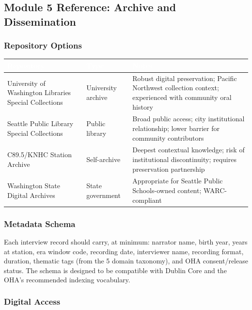 \documentclass[11pt,letterpaper]{article}
\newcommand{\tableheader}[1]{\textbf{\sffamily\textcolor{white}{#1}}}
\begin{document}
\subsection{Module 5 Reference: Archive and Dissemination}

\subsubsection{Repository Options}

\begin{center}
\begin{tabularx}{\textwidth}{L{4cm}L{2.5cm}X}
\toprule
{}
\tableheader{Repository} & \tableheader{Type} & \tableheader{Notes} \\
\midrule
University of Washington Libraries Special Collections & University archive & Robust digital preservation; Pacific Northwest collection context; experienced with community oral history \\
Seattle Public Library Special Collections & Public library & Broad public access; city institutional relationship; lower barrier for community contributors \\
C89.5/KNHC Station Archive & Self-archive & Deepest contextual knowledge; risk of institutional discontinuity; requires preservation partnership \\
Washington State Digital Archives & State government & Appropriate for Seattle Public Schools-owned content; WARC-compliant \\
\bottomrule
\end{tabularx}
\end{center}

\subsubsection{Metadata Schema}

Each interview record should carry, at minimum: narrator name, birth year, years at station, era window code, recording date, interviewer name, recording format, duration, thematic tags (from the 5 domain taxonomy), and OHA consent/release status. The schema is designed to be compatible with Dublin Core and the OHA's recommended indexing vocabulary.

\subsubsection{Digital Access}
\end{document}
